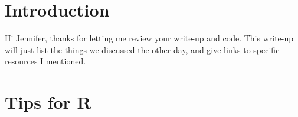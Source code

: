 \documentclass[11pt]{article}
\begin{document}
\maketitle

\setlength{\parindent}{0cm}

\section{Introduction}



Hi Jennifer, thanks for letting me review your write-up and code. This write-up will just list the things we discussed the other day, and give links to specific resources I mentioned.

\section{Tips for \textsf{R}}
\end{document}
